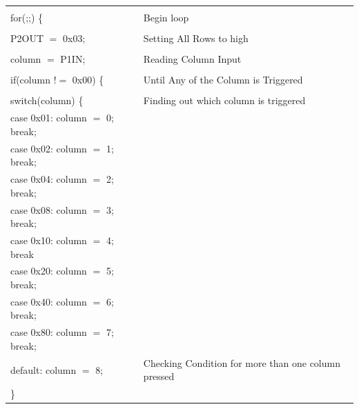 \documentclass[12pt, letterpaper]{article}
\begin{document}
\begin{longtable}{|p{8cm}||p{6cm}|}
   \hspace{0.1cm} & \\
  \hspace{0.1cm}  for(;;) \{   &  Begin loop\\
  \hspace{0.1cm} & \\
     \hspace{0.3cm}   P2OUT $=$ 0x03; & Setting All Rows to high\\   
\hspace{0.1cm} & \\
     \hspace{0.3cm}   column $=$ P1IN; & Reading Column Input\\
     \hspace{0.1cm} & \\
      \hspace{0.3cm}  if(column $!=$ 0x00) \{ & Until Any of the Column is Triggered \\
\hspace{0.1cm} & \\
      \hspace{0.3cm}   switch(column) \{ & Finding out which column is triggered \\
        \hspace{0.5cm}     case 0x01: column $=$ 0; break; & \\ 
        \hspace{0.5cm}    case 0x02: column $=$ 1; break; & \\
        \hspace{0.5cm}   case 0x04: column $=$ 2; break;& \\
        \hspace{0.5cm}    case 0x08: column $=$ 3; break; & \\
        \hspace{0.5cm}    case 0x10: column $=$ 4; break & \\
        \hspace{0.5cm}    case 0x20: column $=$ 5; break; & \\
        \hspace{0.5cm}    case 0x40: column $=$ 6; break; &  \\
            \hspace{0.5cm}   case 0x80: column $=$ 7; break; & \\
            \hspace{0.5cm}     default: column $=$ 8; & Checking Condition for more than one column pressed\\
            \hspace{0.3cm} \} & \\
            

\end{longtable}
\end{document}
